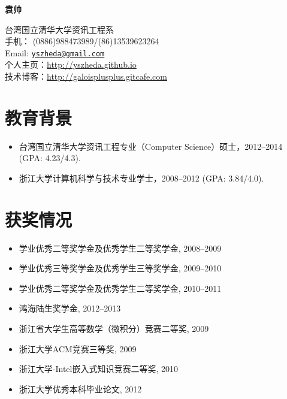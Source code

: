 \documentclass[letterpaper]{article}
\def\name{袁帅}
\begin{document}
\centerline{\huge\bf \name} \vspace{0.25in}
\begin{minipage}[t]{0.8\textwidth}
台湾国立清华大学资讯工程系 \\
手机： (0886)988473989/(86)13539623264   \\
Email: \href{mailto:yszheda@gmail.com}{\tt yszheda@gmail.com}\\
个人主页：\url{http://yszheda.github.io} \\
技术博客：\url{http://galoisplusplus.gitcafe.com}
\end{minipage}

\section*{教育背景}
\begin{itemize}
\item 台湾国立清华大学资讯工程专业（Computer Science）硕士，2012--2014 (GPA: 4.23/4.3).
\item 浙江大学计算机科学与技术专业学士，2008--2012 (GPA: 3.84/4.0).
\end{itemize}

\section*{获奖情况}
\begin{itemize}
  \item 学业优秀二等奖学金及优秀学生二等奖学金, 2008--2009
  \item 学业优秀三等奖学金及优秀学生三等奖学金, 2009--2010
  \item 学业优秀二等奖学金及优秀学生二等奖学金, 2010--2011
  \item 鸿海陆生奖学金, 2012--2013				
  \item 浙江省大学生高等数学（微积分）竞赛二等奖, 2009
  \item 浙江大学ACM竞赛三等奖, 2009
  \item 浙江大学-Intel嵌入式知识竞赛二等奖, 2010
  \item 浙江大学优秀本科毕业论文, 2012
\end{itemize}
\end{document}
